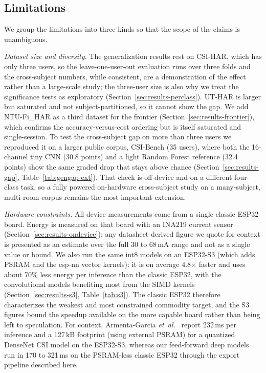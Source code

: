 \documentclass{ieeeaccess}
\begin{document}
\subsection{Limitations}
We group the limitations into three kinds so that the scope of the claims is unambiguous.

\emph{Dataset size and diversity.} The generalization results rest on CSI-HAR, which has only three users, so the leave-one-user-out evaluation runs over three folds and the cross-subject numbers, while consistent, are a demonstration of the effect rather than a large-scale study; the three-user size is also why we treat the significance tests as exploratory (Section~\ref{sec:results-perclass}). UT-HAR is larger but saturated and not subject-partitioned, so it cannot show the gap. We add NTU-Fi\_HAR as a third dataset for the frontier (Section~\ref{sec:results-frontier}), which confirms the accuracy-versus-cost ordering but is itself saturated and single-session. To test the cross-subject gap on more than three users we reproduced it on a larger public corpus, CSI-Bench (35 users), where both the 16-channel tiny CNN (30.8 points) and a light Random Forest reference (32.4 points) show the same graded drop that stays above chance (Section~\ref{sec:results-gap}, Table~\ref{tab:gengap-ext}). That check is off-device and on a different four-class task, so a fully powered on-hardware cross-subject study on a many-subject, multi-room corpus remains the most important extension.

\emph{Hardware constraints.} All device measurements come from a single classic ESP32 board. Energy is measured on that board with an INA219 current sensor (Section~\ref{sec:results-ondevice}); any datasheet-derived figure we quote for context is presented as an estimate over the full 30 to 68\,mA range and not as a single value or bound. We also run the same int8 models on an ESP32-S3 (which adds PSRAM and the esp-nn vector kernels): it is on average 4.8$\times$ faster and uses about 70\% less energy per inference than the classic ESP32, with the convolutional models benefiting most from the SIMD kernels (Section~\ref{sec:results-s3}, Table~\ref{tab:s3}). The classic ESP32 therefore characterizes the weakest and most constrained commodity target, and the S3 figures bound the speedup available on the more capable board rather than being left to speculation. For context, Armenta-Garcia \emph{et~al.}~\cite{hernandez2025tools} report 232\,ms per inference and a 127\,kB footprint (using external PSRAM) for a quantized DenseNet CSI model on the ESP32-S3, whereas our feed-forward deep models run in 170 to 321\,ms on the PSRAM-less classic ESP32 through the export pipeline described here.
\end{document}
